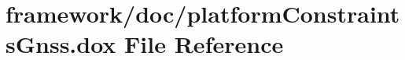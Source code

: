 \hypertarget{platform_constraints_gnss_8dox}{}\section{framework/doc/platform\+Constraints\+Gnss.dox File Reference}
\label{platform_constraints_gnss_8dox}
